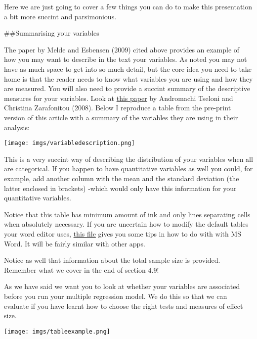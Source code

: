 \documentclass[
]{book}
\begin{document}
Here we are just going to cover a few things you can do to make this presentation a bit more succint and parsimonious.

\#\#Summarising your variables

The paper by Melde and Esbensen (2009) cited above provides an example of how you may want to describe in the text your variables. As noted you may not have as much space to get into so much detail, but the core idea you need to take home is that the reader needs to know what variables you are using and how they are measured. You will also need to provide a succint summary of the descriptive measures for your variables. Look at \href{https://journals.sagepub.com/doi/10.1177/1477370808095123}{this paper} by Andromachi Tseloni and Christina Zarafonitou (2008). Below I reproduce a table from the pre-print version of this article with a summary of the variables they are using in their analysis:

\texttt{[image: imgs/variabledescription.png]}

This is a very succint way of describing the distribution of your variables when all are categorical. If you happen to have quantitative variables as well you could, for example, add another column with the mean and the standard deviation (the latter enclosed in brackets) -which would only have this information for your quantitative variables.

Notice that this table has minimum amount of ink and only lines separating cells when absolutely necessary. If you are uncertain how to modify the default tables your word editor uses, \href{https://github.com/eonk/mcd_book/blob/main/files_docs/wordtables.pdf}{this file} gives you some tips in how to do with with MS Word. It will be fairly similar with other apps.

Notice as well that information about the total sample size is provided. Remember what we cover in the end of section 4.9!

As we have said we want you to look at whether your variables are associated before you run your multiple regression model. We do this so that we can evaluate if you have learnt how to choose the right tests and measures of effect size.

\texttt{[image: imgs/tableexample.png]}
\end{document}

